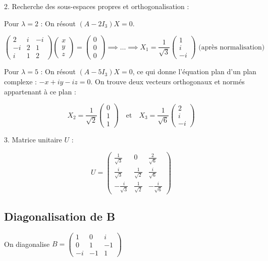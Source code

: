\documentclass[french]{yLectureNote}
\begin{document}
2. Recherche des sous-espaces propres et orthogonalisation :

Pour $\lambda = 2$ : On résout $(A - 2I_3)X = 0$.

$$\begin{pmatrix} 2 & i & -i \\ -i & 2 & 1 \\ i & 1 & 2 \end{pmatrix} \begin{pmatrix} x \\ y \\ z \end{pmatrix} = \begin{pmatrix} 0 \\ 0 \\ 0 \end{pmatrix} \implies \dots \implies X_1 = \frac{1}{\sqrt{3}} \begin{pmatrix} 1 \\ i \\ -i \end{pmatrix} \text{ (après normalisation)}$$


 Pour $\lambda = 5$ : On résout $(A - 5I_3)X = 0$, ce qui donne l'équation plan d'un plan complexe : $-x + iy - iz = 0$.
On trouve deux vecteurs orthogonaux et normés appartenant à ce plan :

$$X_2 = \frac{1}{\sqrt{2}} \begin{pmatrix} 0 \\ 1 \\ 1 \end{pmatrix} \quad \text{et} \quad X_3 = \frac{1}{\sqrt{6}} \begin{pmatrix} 2 \\ i \\ -i \end{pmatrix}$$




3. Matrice unitaire $U$ :

$$U = \begin{pmatrix} \frac{1}{\sqrt{3}} & 0 & \frac{2}{\sqrt{6}} \\ \frac{i}{\sqrt{3}} & \frac{1}{\sqrt{2}} & \frac{i}{\sqrt{6}} \\ -\frac{i}{\sqrt{3}} & \frac{1}{\sqrt{2}} & -\frac{i}{\sqrt{6}} \end{pmatrix}$$

\subsection{Diagonalisation de B}
On diagonalise $B = \begin{pmatrix} 1 & 0 & i \\ 0 & 1 & -1 \\ -i & -1 & 1 \end{pmatrix}$
\end{document}
